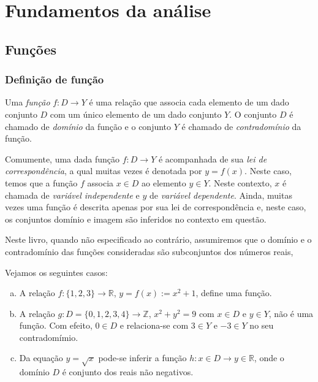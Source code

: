 
\chapter{Fundamentos da análise}\label{c_fund}
\thispagestyle{fancy}

\section{Funções}\label{c_fund_s_funs}

\subsection{Definição de função}

\begin{defn}
  Uma \emph{função} $f:D \to Y$ é uma relação que associa cada elemento de um dado conjunto $D$ com um único elemento de um dado conjunto $Y$. O conjunto $D$ é chamado de \emph{domínio} da função e o conjunto $Y$ é chamado de \emph{contradomínio} da função.
\end{defn}

Comumente, uma dada função $f:D\to Y$ é acompanhada de sua \emph{lei de correspondência}, a qual muitas vezes é denotada por $y = f(x)$. Neste caso, temos que a função $f$ associa $x\in D$ ao elemento $y\in Y$. Neste contexto, $x$ é chamada de \emph{variável independente} e $y$ de \emph{variável dependente}. Ainda, muitas vezes uma função é descrita apenas por sua lei de correspondência e, neste caso, os conjuntos domínio e imagem são inferidos no contexto em questão.

\begin{obs}
  Neste livro, quando não especificado ao contrário, assumiremos que o domínio e o contradomínio das funções consideradas são subconjuntos dos números reais,
\end{obs}

\begin{ex} Vejamos os seguintes casos:
  \begin{enumerate}[a)]
  \item A relação $f:\{1,2,3\}\to\mathbb{R}$, $y = f(x) := x^2 + 1$, define uma função.
  \item A relação $g:D=\{0,1,2,3,4\}\to\mathbb{Z}$, $x^2 + y^2 = 9$ com $x\in D$ e $y\in Y$, não é uma função. Com efeito, $0\in D$ e relaciona-se com $3\in Y$ e $-3\in Y$ no seu contradomímio.
  \item Da equação $y = \sqrt{x}$ pode-se inferir a função $h:x\in D \to y\in\mathbb{R}$, onde o domínio $D$ é conjunto dos reais não negativos.
  \end{enumerate}
\end{ex}

